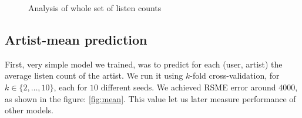 \documentclass{article}
\begin{document}
\begin{figure}[!t]
\center
{}
\hfill
{}

\caption{Analysis of whole set of listen counts}
\end{figure}
\subsection*{Artist-mean prediction}
First, very simple model we trained, was to predict for each (user, artist) the average listen count of the artist. %
 We run it using $k$-fold cross-validation, for $k\in\{2,\ldots, 10\}$, each for $10$ different seeds. We achieved RSME error around $4000$, as shown in the figure: \ref{fig:mean}. This value let us later measure performance of other models. 
 
\end{document}

